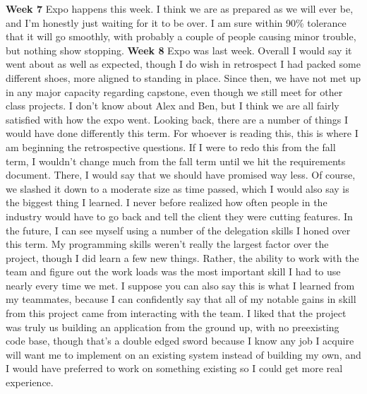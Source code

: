 \documentclass[onecolumn, draftclsnofoot,10pt, compsoc]{IEEEtran}
\begin{document}
\newline
\textbf{Week 7}
\newline
Expo happens this week. I think we are as prepared as we will ever be, and I'm honestly just waiting for it to be over. I am sure within 90\% tolerance that it will go smoothly, with probably a couple of people causing minor trouble, but nothing show stopping.
\newline
\textbf{Week 8}
\newline
Expo was last week. Overall I would say it went about as well as expected, though I do wish in retrospect I had packed some different shoes, more aligned to standing in place. Since then, we have not met up in any major capacity regarding capstone, even though we still meet for other class projects. I don't know about Alex and Ben, but I think we are all fairly satisfied with how the expo went.
\newline
Looking back, there are a number of things I would have done differently this term. For whoever is reading this, this is where I am beginning the retrospective questions.
\newline
If I were to redo this from the fall term, I wouldn't change much from the fall term until we hit the requirements document. There, I would say that we should have promised way less. Of course, we slashed it down to a moderate size as time passed, which I would also say is the biggest thing I learned. I never before realized how often people in the industry would have to go back and tell the client they were cutting features.
\newline
In the future, I can see myself using a number of the delegation skills I honed over this term. My programming skills weren't really the largest factor over the project, though I did learn a few new things. Rather, the ability to work with the team and figure out the work loads was the most important skill I had to use nearly every time we met. I suppose you can also say this is what I learned from my teammates, because I can confidently say that all of my notable gains in skill from this project came from interacting with the team.
\newline
I liked that the project was truly us building an application from the ground up, with no preexisting code base, though that's a double edged sword because I know any job I acquire will want me to implement on an existing system instead of building my own, and I would have preferred to work on something existing so I could get more real experience.
\newline
\end{document}
